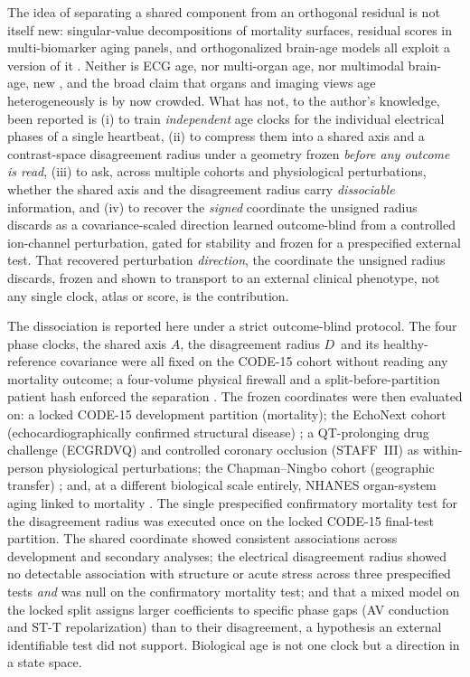 \documentclass[11pt]{article}
\newcommand{\D}{\ensuremath{D}}
\newcommand{\A}{\ensuremath{A}}
\begin{document}
The idea of separating a shared component from an orthogonal residual is not itself
new: singular-value decompositions of mortality surfaces, residual scores in
multi-biomarker aging panels, and orthogonalized brain-age models all exploit a
version of it \citep{disco2025,cohen2013}. Neither is ECG age, nor multi-organ age, nor
multimodal brain-age, new \citep{lima2021,attia2019,tian2023,oh2023,ladejobi2021,wen2024,li2025},
and the broad claim that organs and imaging views age heterogeneously is by now crowded. What
has not, to the author's knowledge, been reported is (i) to train \emph{independent} age clocks for the individual
electrical phases of a single heartbeat, (ii) to compress them into a shared axis and
a contrast-space disagreement radius under a geometry frozen \emph{before any outcome is
read}, (iii) to ask, across multiple cohorts and physiological perturbations,
whether the shared axis and the disagreement radius carry \emph{dissociable}
information, and (iv) to recover the \emph{signed} coordinate the unsigned radius discards
as a covariance-scaled direction learned outcome-blind from a controlled ion-channel
perturbation, gated for stability and frozen for a prespecified external test. That
recovered perturbation \emph{direction}, the coordinate the unsigned radius discards, frozen
and shown to transport to an external clinical phenotype, not any single clock, atlas or score,
is the contribution.

The dissociation is reported here under a strict outcome-blind protocol. The four phase clocks, the
shared axis \A, the disagreement radius \D\ and its healthy-reference covariance were
all fixed on the CODE-15 cohort without reading any mortality outcome; a four-volume
physical firewall and a split-before-partition patient hash enforced the separation
\citep{code15}. The frozen coordinates were then evaluated on: a locked CODE-15
development partition (mortality); the EchoNext cohort (echocardiographically
confirmed structural disease) \citep{echonext,poterucha2025}; a QT-prolonging drug challenge
(ECGRDVQ) \citep{ecgrdvq,johannesen2014} and controlled coronary occlusion (STAFF~III)
\citep{staff,martinez2017} as within-person physiological perturbations; the Chapman--Ningbo
cohort (geographic transfer) \citep{chapman}; and, at a different biological scale
entirely, NHANES organ-system aging linked to mortality \citep{nhanes}. The single
prespecified confirmatory mortality test for the disagreement radius was executed once
on the locked CODE-15 final-test partition. The shared coordinate showed
consistent associations across development and secondary analyses; the
electrical disagreement radius showed no detectable
association with structure or acute stress across three prespecified tests \emph{and} was null on the confirmatory
mortality test; and that a mixed model on the locked split assigns larger coefficients to
specific phase gaps (AV conduction and ST-T repolarization) than to their disagreement, a
hypothesis an external identifiable test did not support. Biological age is not one clock but a
direction in a state space.
\end{document}
